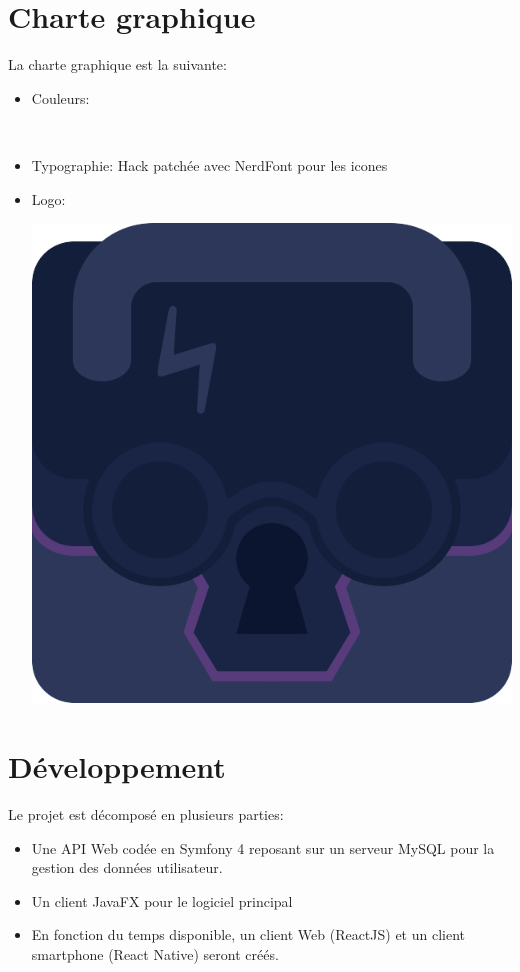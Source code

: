 \documentclass[oneside]{report}
\newcommand{\writecol}[1] {
	\subitem{\textcolor[HTML]{#1}{\# #1}}
}
\begin{document}
	\section{Charte graphique}
	{
		\par La charte graphique est la suivante:\\
		\begin{itemize}
			\item Couleurs:
				\writecol{0C1530}
				\writecol{131e3b}
				\writecol{1A2546}
				\writecol{573b7a}
				\writecol{2C375A}
				\writecol{016937}
				\writecol{06a75b}\\
			\item Typographie: Hack patchée avec NerdFont pour les icones\\
			\item{Logo:}\\
				\par\includegraphics[scale=.125]{logo}
		\end{itemize}
	}

	\section{Développement}
	{
		\par Le projet est décomposé en plusieurs parties:
		\begin{itemize}
			\item \par Une API Web codée en Symfony 4 reposant sur un serveur MySQL pour la gestion des données utilisateur.\\
			\item \par Un client JavaFX pour le logiciel principal\\
			\item \par En fonction du temps disponible, un client Web (ReactJS) et un client smartphone (React Native) seront créés. 
		\end{itemize}
	}
\end{document}
